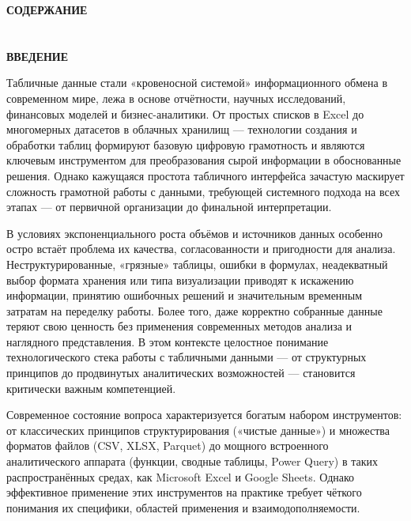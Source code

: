 \documentclass{SibFU-docs}
\begin{document}
\newpage

\thispagestyle{empty}
\begin{center}
\bfseries СОДЕРЖАНИЕ
\end{center}
\vspace{-6pt}
\tableofcontents
\clearpage

\section*{}
\vspace*{-2.5em}
\begin{center}\textbf{ВВЕДЕНИЕ}\end{center}
{}

Табличные данные стали «кровеносной системой» информационного обмена в современном мире, лежа в основе отчётности, научных исследований, финансовых моделей и бизнес-аналитики. От простых списков в Excel до многомерных датасетов в облачных хранилищ — технологии создания и обработки таблиц формируют базовую цифровую грамотность и являются ключевым инструментом для преобразования сырой информации в обоснованные решения. Однако кажущаяся простота табличного интерфейса зачастую маскирует сложность грамотной работы с данными, требующей системного подхода на всех этапах — от первичной организации до финальной интерпретации.

В условиях экспоненциального роста объёмов и источников данных особенно остро встаёт проблема их качества, согласованности и пригодности для анализа. Неструктурированные, «грязные» таблицы, ошибки в формулах, неадекватный выбор формата хранения или типа визуализации приводят к искажению информации, принятию ошибочных решений и значительным временным затратам на переделку работы. Более того, даже корректно собранные данные теряют свою ценность без применения современных методов анализа и наглядного представления. В этом контексте целостное понимание технологического стека работы с табличными данными — от структурных принципов до продвинутых аналитических возможностей — становится критически важным компетенцией.

Современное состояние вопроса характеризуется богатым набором инструментов: от классических принципов структурирования («чистые данные») и множества форматов файлов (CSV, XLSX, Parquet) до мощного встроенного аналитического аппарата (функции, сводные таблицы, Power Query) в таких распространённых средах, как Microsoft Excel и Google Sheets. Однако эффективное применение этих инструментов на практике требует чёткого понимания их специфики, областей применения и взаимодополняемости.
\end{document}
